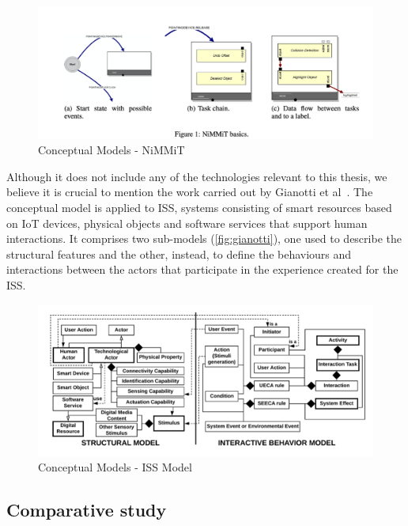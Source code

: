 \begin{figure}[htbp]
    \centering
    \includegraphics[width=\linewidth]{Figures/Background/models/vanacken1.png}
    \caption{Conceptual Models - NiMMiT}
    \label{fig:vanacken}
\end{figure}

Although it does not include any of the technologies relevant to this thesis, we believe it is crucial to mention the work carried out by Gianotti et al~\cite{dobbie_modeling_2020}. The conceptual model is applied to ISS, systems consisting of smart resources based on IoT devices, physical objects and software services that support human interactions. It comprises two sub-models (\autoref{fig:gianotti}), one used to describe the structural features and the other, instead, to define the behaviours and interactions between the actors that participate in the experience created for the ISS. 

\begin{figure}[htbp]
    \centering
    \includegraphics[width=\textwidth]{Figures/Background/models/gianotti.png}
    \caption{Conceptual Models - ISS Model}
    \label{fig:gianotti}
\end{figure}

\subsection{Comparative study}

